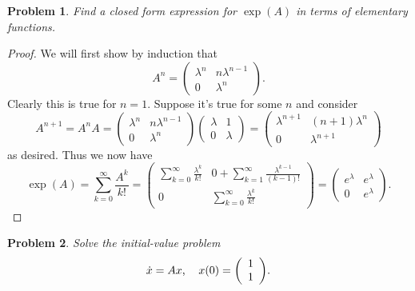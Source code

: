 \documentclass{article}
\newtheorem{problem}{Problem}
\begin{document}
\begin{problem}
Find a closed form expression for $\exp(A)$ in terms of elementary functions.
\end{problem}
\begin{proof}
We will first show by induction that
\[
A^n =
\left (
\begin{array}{cc}
\lambda^n & n \lambda^{n-1}\\
0 & \lambda^n
\end{array}
\right ).
\]
Clearly this is true for $n = 1$. Suppose it's true for some $n$ and consider
\[
A^{n+1} = A^n A =
\left (
\begin{array}{cc}
\lambda^n & n \lambda^{n-1}\\
0 & \lambda^n
\end{array}
\right ) \left (
\begin{array}{cc}
\lambda & 1\\
0 & \lambda
\end{array}
\right )
=
\left (
\begin{array}{cc}
\lambda^{n+1} & (n+1)\lambda^n\\
0 & \lambda^{n+1}
\end{array}
\right )
\]
as desired. Thus we now have
\[
\exp(A) = \sum_{k=0}^{\infty} \frac{A^k}{k!} =
\left (
\begin{array}{cc}
\sum_{k=0}^{\infty} \frac{\lambda^k}{k!} & 0 + \sum_{k=1}^{\infty} \frac{\lambda^{k-1}}{(k-1)!}\\
0 & \sum_{k=0}^{\infty} \frac{\lambda^k}{k!}
\end{array}
\right ) = \left (
\begin{array}{cc}
e^{\lambda} & e^{\lambda}\\
0 & e^{\lambda}
\end{array}
\right ).
\]
\end{proof}

\begin{problem}
Solve the initial-value problem
\[
\begin{tabular}{cc}
$\displaystyle{\dot{x} = Ax}$, & $\displaystyle{x(0) = \left ( \begin{array}{c} 1\\ 1 \end{array} \right )}$.
\end{tabular}
\]
\end{problem}
\end{document}

